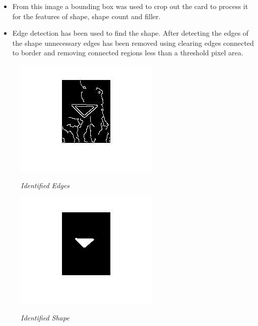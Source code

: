 \begin{itemize}
	\item From this image a bounding box was used to crop out the card to process it for the features of shape, shape count and filler.
\end{itemize}

\begin{itemize}
	\item Edge detection has been used to find the shape. After detecting the edges of the shape unnecessary edges has been removed using clearing edges connected to border and removing connected regions less than a threshold pixel area.
	
\end{itemize}
\begin{figure}[position = here]
	\begin{centering}
		\includegraphics[scale=0.8]{./sachiths_images/image10.jpg}\\
		\caption[]{\textit{Identified Edges}}
	\end{centering}
\end{figure}
\begin{figure}[position = here]
	\begin{centering}
		\includegraphics[scale=0.8]{./sachiths_images/image11.jpg}\\
		\caption[]{\textit{Identified Shape}}
	\end{centering}
\end{figure}
